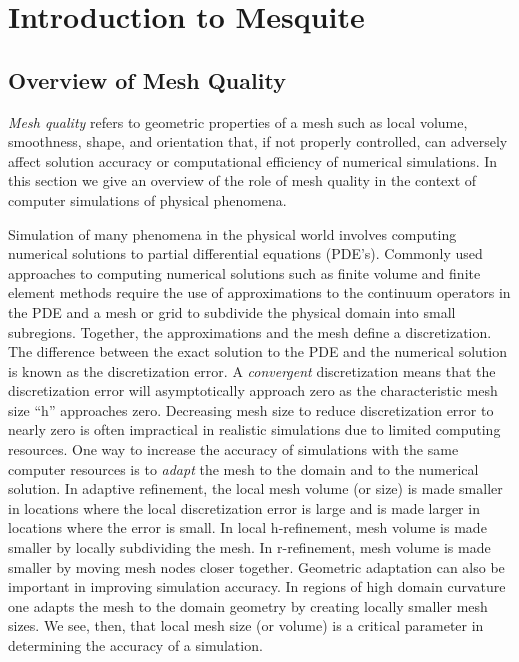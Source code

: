 \chapter{Introduction to Mesquite} \label{sec:intro}

\section{Overview of Mesh Quality}

\hskip 0.25in {\it Mesh quality} refers to geometric properties of a mesh such as
local volume, smoothness, shape, and orientation that, if not properly
controlled,
can adversely affect solution accuracy or computational efficiency of numerical simulations. In this section we give an overview of the role of mesh quality
in the context of computer simulations of physical phenomena. \newline

Simulation of many phenomena in the physical world involves computing
numerical
solutions to partial differential equations (PDE's). Commonly used approaches
to computing  numerical solutions such as finite volume and finite
element methods require the use of approximations to the continuum operators
in the PDE and a mesh or grid to subdivide the physical domain into small
subregions. Together, the approximations and the mesh define a discretization.
The difference between the exact solution to the PDE and the numerical solution is known as the discretization error. A {\it convergent}
discretization means that the discretization error will asymptotically
approach zero as the characteristic mesh size ``h''
approaches zero. Decreasing mesh size to reduce discretization error to
nearly zero is often impractical in realistic simulations due to limited
computing resources. One way to increase the accuracy of simulations with the
same computer resources is to {\it adapt} the mesh to the domain and to the
numerical solution. In adaptive refinement, the local mesh volume (or size)
is made smaller in locations where the local discretization error is large and
is made larger in locations where the error is small. In local h-refinement,
mesh volume is made smaller by locally subdividing the mesh. In
r-refinement, mesh volume is made smaller by moving mesh nodes closer together.
Geometric adaptation can also be important in improving simulation accuracy. In regions of high domain curvature one adapts the mesh to the domain geometry by creating locally smaller mesh sizes. We see, then, that local mesh size (or volume) is a critical parameter in determining the accuracy of a simulation. \newline

